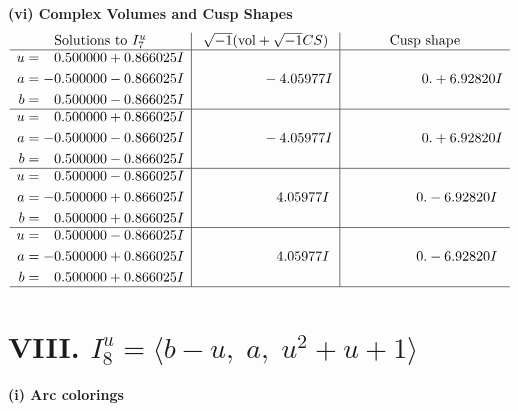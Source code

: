 \documentclass[1p]{elsarticle_modified}
\theoremstyle{definition}
\newcommand{\I}{\sqrt{-1}}
\begin{document}
\newpage\flushleft \textbf{(vi) Complex Volumes and Cusp Shapes}
$$\begin{array}{c|c|c}  
\text{Solutions to }I^u_{7}& \I (\text{vol} + \sqrt{-1}CS) & \text{Cusp shape}\\
 \hline 
\begin{aligned}
u &= \phantom{-}0.500000 + 0.866025 I \\
a &= -0.500000 - 0.866025 I \\
b &= \phantom{-}0.500000 - 0.866025 I\end{aligned}
 & \phantom{-0.000000 } -4.05977 I & \phantom{-0.000000 -}0. + 6.92820 I \\ \hline\begin{aligned}
u &= \phantom{-}0.500000 + 0.866025 I \\
a &= -0.500000 - 0.866025 I \\
b &= \phantom{-}0.500000 - 0.866025 I\end{aligned}
 & \phantom{-0.000000 } -4.05977 I & \phantom{-0.000000 -}0. + 6.92820 I \\ \hline\begin{aligned}
u &= \phantom{-}0.500000 - 0.866025 I \\
a &= -0.500000 + 0.866025 I \\
b &= \phantom{-}0.500000 + 0.866025 I\end{aligned}
 & \phantom{-0.000000 -}4.05977 I & \phantom{-0.000000 } 0. - 6.92820 I \\ \hline\begin{aligned}
u &= \phantom{-}0.500000 - 0.866025 I \\
a &= -0.500000 + 0.866025 I \\
b &= \phantom{-}0.500000 + 0.866025 I\end{aligned}
 & \phantom{-0.000000 -}4.05977 I & \phantom{-0.000000 } 0. - 6.92820 I\\
 \hline 
 \end{array}$$\newpage\newpage\renewcommand{\arraystretch}{1}
\centering \section*{VIII. $I^u_{8}= \langle b- u,\;a,\;u^2+u+1 \rangle$}
\flushleft \textbf{(i) Arc colorings}\\
\end{document}
